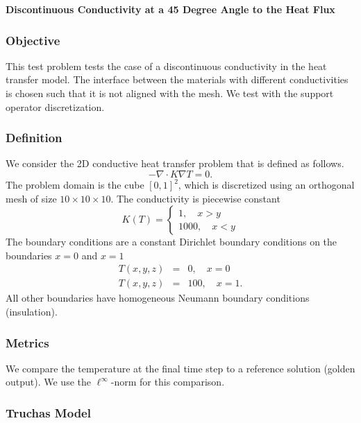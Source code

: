 \documentclass[12pt]{article}
\begin{document}
\begin{center}
{\large {\bf Discontinuous Conductivity at a 45 Degree Angle to the Heat Flux}}
\end{center}

\subsubsection*{Objective}


This test problem tests the case of a discontinuous conductivity in
the heat transfer model. The interface between the materials with
different conductivities is chosen such that it is not aligned with
the mesh. We test with the support operator discretization. 


\subsubsection*{Definition}

We consider the 2D conductive heat transfer problem that is defined as
follows.
$$
-\nabla\cdot K\nabla T = 0.
$$
The problem domain is the cube $[0,1]^2$, which is
discretized using an orthogonal mesh of size $10 \times
10 \times 10$. The conductivity is piecewise constant
$$
K(T) = \left\{\begin{array}{l}
              1,\quad x > y \\
              1000,\quad x < y
             \end{array}
             \right.
$$
The boundary conditions are a constant Dirichlet boundary conditions
on the boundaries $x=0$ and $x=1$ 
\begin{eqnarray*}
T(x,y,z) &=& 0,\quad x=0 \\
T(x,y,z) &=& 100,\quad x=1. 
\end{eqnarray*} 
All other boundaries have homogeneous Neumann boundary conditions
(insulation). 

\subsubsection*{Metrics}

We compare the temperature at the final time step to a reference
solution (golden output).
We use the $\ell^\infty$-norm for this comparison. 

\subsubsection*{Truchas Model}
\end{document}
